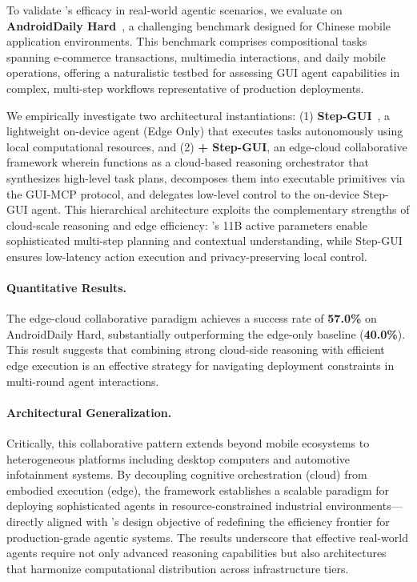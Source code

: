 To validate \ourmodel's efficacy in real-world agentic scenarios, we evaluate on \textbf{AndroidDaily Hard}~\cite{yan2025step}, a challenging benchmark designed for Chinese mobile application environments. This benchmark comprises compositional tasks spanning e-commerce transactions, multimedia interactions, and daily mobile operations, offering a naturalistic testbed for assessing GUI agent capabilities in complex, multi-step workflows representative of production deployments.

We empirically investigate two architectural instantiations: (1) \textbf{Step-GUI}~\cite{yan2025step}, a lightweight on-device agent (Edge Only) that executes tasks autonomously using local computational resources, and (2) \textbf{\ourmodel + Step-GUI}, an edge-cloud collaborative framework wherein \ourmodel functions as a cloud-based reasoning orchestrator that synthesizes high-level task plans, decomposes them into executable primitives via the GUI-MCP protocol, and delegates low-level control to the on-device Step-GUI agent. This hierarchical architecture exploits the complementary strengths of cloud-scale reasoning and edge efficiency: \ourmodel's 11B active parameters enable sophisticated multi-step planning and contextual understanding, while Step-GUI ensures low-latency action execution and privacy-preserving local control.

\paragraph{Quantitative Results.} The edge-cloud collaborative paradigm achieves a success rate of \textbf{57.0\%} on AndroidDaily Hard, substantially outperforming the edge-only baseline (\textbf{40.0\%}). This result suggests that combining strong cloud-side reasoning with efficient edge execution is an effective strategy for navigating deployment constraints in multi-round agent interactions.

\paragraph{Architectural Generalization.} Critically, this collaborative pattern extends beyond mobile ecosystems to heterogeneous platforms including desktop computers and automotive infotainment systems. By decoupling cognitive orchestration (cloud) from embodied execution (edge), the framework establishes a scalable paradigm for deploying sophisticated agents in resource-constrained industrial environments—directly aligned with \ourmodel's design objective of redefining the efficiency frontier for production-grade agentic systems. The results underscore that effective real-world agents require not only advanced reasoning capabilities but also architectures that harmonize computational distribution across infrastructure tiers.